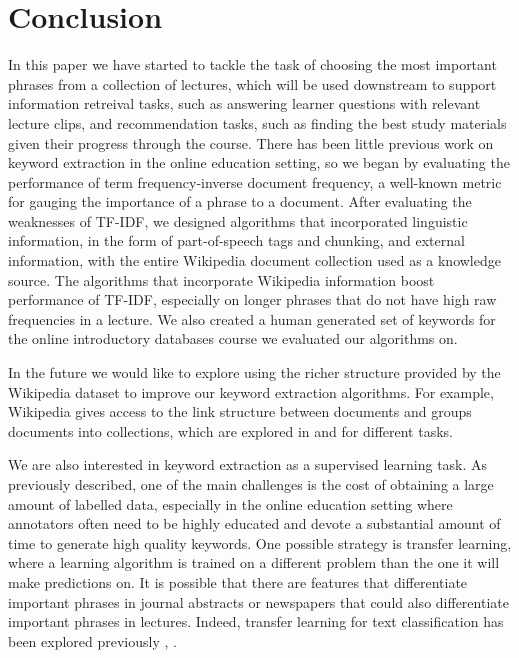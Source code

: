 \section{Conclusion}
\label{sec:conclusion}

In this paper we have started to tackle the task of choosing the most important phrases from a collection of lectures, which will be used downstream to support information retreival tasks, such as answering learner questions with relevant lecture clips, and recommendation tasks, such as finding the best study materials given their progress through the course. There has been little previous work on keyword extraction in the online education setting, so we began by evaluating the performance of term frequency-inverse document frequency, a well-known metric for gauging the importance of a phrase to a document. After evaluating the weaknesses of TF-IDF, we designed algorithms that incorporated linguistic information, in the form of part-of-speech tags and chunking, and external information, with the entire Wikipedia document collection used as a knowledge source. The algorithms that incorporate Wikipedia information boost performance of TF-IDF, especially on longer phrases that do not have high raw frequencies in a lecture. We also created a human generated set of keywords for the online introductory databases course we evaluated our algorithms on.

In the future we would like to explore using the richer structure provided by the Wikipedia dataset to improve our keyword extraction algorithms. For example, Wikipedia gives access to the link structure between documents and groups documents into collections, which are explored in \cite{hu2009exploiting} and \cite{milne2007computing} for different tasks.

We are also interested in keyword extraction as a supervised learning task. As previously described, one of the main challenges is the cost of obtaining a large amount of labelled data, especially in the online education setting where annotators often need to be highly educated and devote a substantial amount of time to generate high quality keywords. One possible strategy is transfer learning, where a learning algorithm is trained on a different problem than the one it will make predictions on. It is possible that there are features that differentiate important phrases in journal abstracts or newspapers that could also differentiate important phrases in lectures. Indeed, transfer learning for text classification has been explored previously \cite{raina2006constructing}, \cite{do2005transfer}.